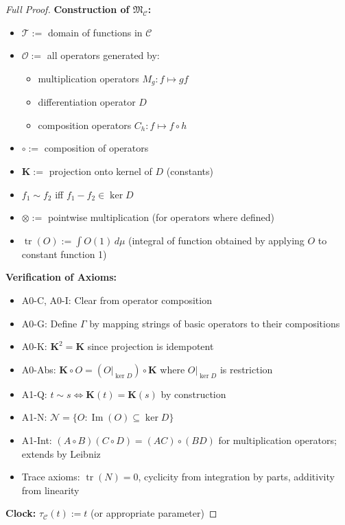 \documentclass[12pt, oneside]{article}
\DeclareMathOperator{\tr}{tr}
\newcommand{\K}{\mathbf{K}}
\newcommand{\N}{\mathcal{N}}
\newcommand{\T}{\mathcal{T}}
\newcommand{\Opr}{\mathcal{O}}
\newcommand{\mf}[1]{\mathfrak{#1}}
\begin{document}
\begin{proof}[Full Proof]
\textbf{Construction of $\mf{M}_{\mathcal{C}}$:}
\begin{itemize}
    \item $\T :=$ domain of functions in $\mathcal{C}$
    \item $\Opr :=$ all operators generated by:
    \begin{itemize}
        \item multiplication operators $M_g: f \mapsto gf$
        \item differentiation operator $D$
        \item composition operators $C_h: f \mapsto f \circ h$
    \end{itemize}
    \item $\circ :=$ composition of operators
    \item $\K :=$ projection onto kernel of $D$ (constants)
    \item $f_1 \sim f_2$ iff $f_1 - f_2 \in \ker D$
    \item $\otimes :=$ pointwise multiplication (for operators where defined)
    \item $\tr(O) := \int O(1) \, d\mu$ (integral of function obtained by applying $O$ to constant function 1)
\end{itemize}

\textbf{Verification of Axioms:}
\begin{itemize}
    \item A0-C, A0-I: Clear from operator composition
    \item A0-G: Define $\Gamma$ by mapping strings of basic operators to their compositions
    \item A0-K: $\K^2 = \K$ since projection is idempotent
    \item A0-Abs: $\K \circ O = (O|_{\ker D}) \circ \K$ where $O|_{\ker D}$ is restriction
    \item A1-Q: $t \sim s \iff \K(t) = \K(s)$ by construction
    \item A1-N: $\N = \{O: \operatorname{Im}(O) \subseteq \ker D\}$
    \item A1-Int: $(A \circ B)(C \circ D) = (AC) \circ (BD)$ for multiplication operators; extends by Leibniz
    \item Trace axioms: $\tr(N)=0$, cyclicity from integration by parts, additivity from linearity
\end{itemize}

\textbf{Clock:} $\tau_{\mathcal{C}}(t) := t$ (or appropriate parameter)


\end{proof}
\end{document}
